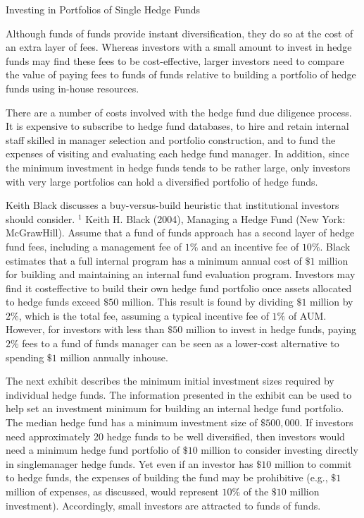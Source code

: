 \documentclass[11pt]{article}
\begin{document}
Investing in Portfolios of Single Hedge Funds

Although funds of funds provide instant diversification, they do so at the cost of an extra layer of fees. Whereas investors with a small amount to invest in hedge funds may find these fees to be cost-effective, larger investors need to compare the value of paying fees to funds of funds relative to building a portfolio of hedge funds using in-house resources.

There are a number of costs involved with the hedge fund due diligence process. It is expensive to subscribe to hedge fund databases, to hire and retain internal staff skilled in manager selection and portfolio construction, and to fund the expenses of visiting and evaluating each hedge fund manager. In addition, since the minimum investment in hedge funds tends to be rather large, only investors with very large portfolios can hold a diversified portfolio of hedge funds.

Keith Black discusses a buy-versus-build heuristic that institutional investors should consider. ${ }^{1}$ Keith H. Black (2004), Managing a Hedge Fund (New York: McGrawHill). Assume that a fund of funds approach has a second layer of hedge fund fees, including a management fee of $1 \%$ and an incentive fee of $10 \%$. Black estimates that a full internal program has a minimum annual cost of $\$ 1$ million for building and maintaining an internal fund evaluation program. Investors may find it costeffective to build their own hedge fund portfolio once assets allocated to hedge funds exceed $\$ 50$ million. This result is found by dividing $\$ 1$ million by $2 \%$, which is the total fee, assuming a typical incentive fee of $1 \%$ of AUM. However, for investors with less than $\$ 50$ million to invest in hedge funds, paying $2 \%$ fees to a fund of funds manager can be seen as a lower-cost alternative to spending $\$ 1$ million annually inhouse.

The next exhibit describes the minimum initial investment sizes required by individual hedge funds. The information presented in the exhibit can be used to help set an investment minimum for building an internal hedge fund portfolio. The median hedge fund has a minimum investment size of $\$ 500,000$. If investors need approximately 20 hedge funds to be well diversified, then investors would need a minimum hedge fund portfolio of $\$ 10$ million to consider investing directly in singlemanager hedge funds. Yet even if an investor has $\$ 10$ million to commit to hedge funds, the expenses of building the fund may be prohibitive (e.g., $\$ 1$ million of expenses, as discussed, would represent $10 \%$ of the $\$ 10$ million investment). Accordingly, small investors are attracted to funds of funds.
\end{document}
